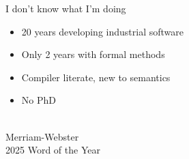 \begin{slide}[Confession]
  \vspace*{4mm}
  \begin{center}
    {\LARGE I don't know what I'm doing}\\[6mm]
  \end{center}
\end{slide}

\begin{slide}[Beginner]
  \vspace*{4mm}
  \begin{center}
  \begin{minipage}{.88\textwidth}\LARGE
  \begin{itemize}\setlength\itemsep{2mm}
    \item 20 years developing industrial software
    \item Only 2 years with formal methods
    \item Compiler literate, new to semantics
    \item No PhD
  \end{itemize}
  \end{minipage}
  \end{center}
\end{slide}

\begin{slide}
  \begin{center}
    \\[6mm]
    {\rmfamily\color{muted}\LARGE Merriam-Webster\\
      \Large 2025 Word of the Year}
  \end{center}
\end{slide}

\begin{slide}
\end{slide}

\begin{slide}[Evidence]
\end{slide}

